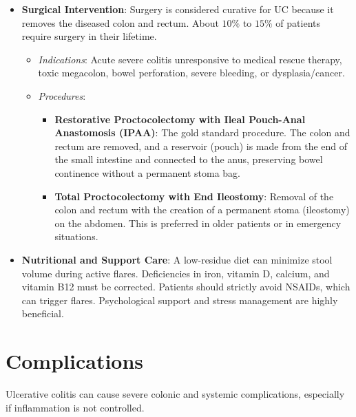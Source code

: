 \begin{itemize}
\begin{itemize}
\begin{itemize}
      \item \textbf{Janus Kinase (JAK) Inhibitors}: Tofacitinib, upadacitinib, and filgotinib are oral medications that block inflammatory cytokine pathways, offering rapid symptom relief.
      \item \textbf{Sphingosine-1-Phosphate (S1P) Receptor Modulators}: Ozanimod and etrasimod are oral drugs that prevent inflammatory white blood cells from leaving lymph nodes, reducing migration to the colon.
    \end{itemize}
  \end{itemize}
  \item \textbf{Surgical Intervention}: Surgery is considered curative for UC because it removes the diseased colon and rectum. About $10\%$ to $15\%$ of patients require surgery in their lifetime.
  \begin{itemize}
    \item \textit{Indications}: Acute severe colitis unresponsive to medical rescue therapy, toxic megacolon, bowel perforation, severe bleeding, or dysplasia/cancer.
    \item \textit{Procedures}:
    \begin{itemize}
      \item \textbf{Restorative Proctocolectomy with Ileal Pouch-Anal Anastomosis (IPAA)}: The gold standard procedure. The colon and rectum are removed, and a reservoir (pouch) is made from the end of the small intestine and connected to the anus, preserving bowel continence without a permanent stoma bag.
      \item \textbf{Total Proctocolectomy with End Ileostomy}: Removal of the colon and rectum with the creation of a permanent stoma (ileostomy) on the abdomen. This is preferred in older patients or in emergency situations.
    \end{itemize}
  \end{itemize}
  \item \textbf{Nutritional and Support Care}: A low-residue diet can minimize stool volume during active flares. Deficiencies in iron, vitamin D, calcium, and vitamin B12 must be corrected. Patients should strictly avoid NSAIDs, which can trigger flares. Psychological support and stress management are highly beneficial.
\end{itemize}

\section*{Complications}
Ulcerative colitis can cause severe colonic and systemic complications, especially if inflammation is not controlled.

